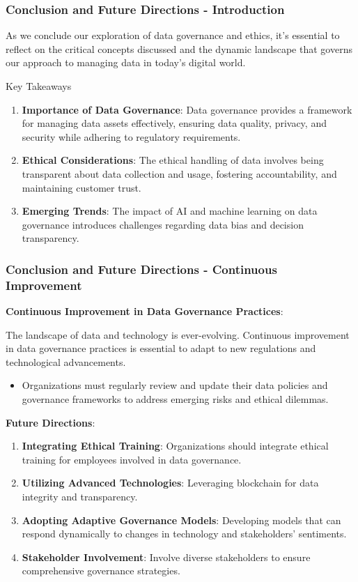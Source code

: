 \documentclass[aspectratio=169]{beamer}
\begin{document}
\begin{frame}[fragile]
    \frametitle{Conclusion and Future Directions - Introduction}
    As we conclude our exploration of data governance and ethics, it's essential to reflect on the critical concepts discussed and the dynamic landscape that governs our approach to managing data in today’s digital world.

    \begin{block}{Key Takeaways}
        \begin{enumerate}
            \item \textbf{Importance of Data Governance}: 
            Data governance provides a framework for managing data assets effectively, ensuring data quality, privacy, and security while adhering to regulatory requirements.
            \item \textbf{Ethical Considerations}: 
            The ethical handling of data involves being transparent about data collection and usage, fostering accountability, and maintaining customer trust.
            \item \textbf{Emerging Trends}: 
            The impact of AI and machine learning on data governance introduces challenges regarding data bias and decision transparency.
        \end{enumerate}
    \end{block}
\end{frame}

\begin{frame}[fragile]
    \frametitle{Conclusion and Future Directions - Continuous Improvement}
    \textbf{Continuous Improvement in Data Governance Practices}:
    
    The landscape of data and technology is ever-evolving. Continuous improvement in data governance practices is essential to adapt to new regulations and technological advancements. 

    \begin{itemize}
        \item Organizations must regularly review and update their data policies and governance frameworks to address emerging risks and ethical dilemmas.
    \end{itemize}

    \textbf{Future Directions}:
    \begin{enumerate}
        \item \textbf{Integrating Ethical Training}: 
        Organizations should integrate ethical training for employees involved in data governance.
        \item \textbf{Utilizing Advanced Technologies}: 
        Leveraging blockchain for data integrity and transparency.
        \item \textbf{Adopting Adaptive Governance Models}: 
        Developing models that can respond dynamically to changes in technology and stakeholders' sentiments.
        \item \textbf{Stakeholder Involvement}: 
        Involve diverse stakeholders to ensure comprehensive governance strategies.
    \end{enumerate}
\end{frame}
\end{document}
